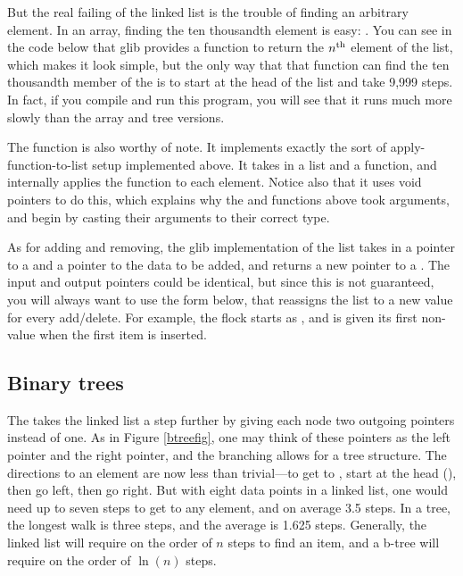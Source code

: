 But the real failing of the linked list is the trouble of finding an
arbitrary element.  In an array, finding the ten thousandth element is
easy: .
You can see in the code below
that glib provides a  function to return the
$n^{\rm th}$ element of the list, which makes it look simple,
but the only way that that function can find the ten
thousandth member of the  is to start at the head of the list
and take 9,999 
steps. In fact, if you compile and run this
program, you will see that it runs much more slowly than the array and tree 
versions.

 The  function is also worthy of note. It implements
exactly the sort of apply-function-to-list setup implemented above. It
takes in a list and a function, and internally applies the function to
each element. Notice also that it uses void pointers to do this, which
explains why the  and  functions
above took  arguments, and begin by casting their arguments to
their correct type.

 As for adding and removing, the glib implementation of the list takes in
a pointer to a  and a pointer to the data to be added, and
returns a new pointer to a . The input and output pointers
could be identical, but since this is not guaranteed, you will always
want to use the form below, that reassigns the list to a new value for
every add/delete. For example, the flock starts as , and is
given its first non- value when the first item is inserted.





\subsection{Binary trees} The  takes the linked list a step further
by giving each node two outgoing pointers instead of one. As in Figure
\ref{btreefig}, one may think of these pointers as the left pointer and
the right pointer, and the branching allows for a tree structure. The
directions to an element are now less than trivial---to get to
, start at the head (), then go left, then go right.
But with eight data points in a linked list, one would need up to seven
steps to get to any element, and on average 3.5 steps. In a tree, the
longest walk is three steps, and the average is 1.625 steps. Generally,
the linked list will require on the order of $n$ steps to find an item, and a b-tree
will require on the order of $\ln(n)$ steps.

